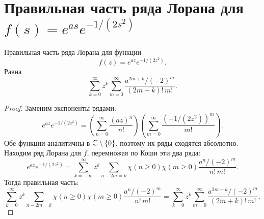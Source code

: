\section{Правильная часть ряда Лорана для $f(s) = e^{as} e^{-1/(2s^2)}$}
\begin{Th*}
    Правильная часть ряда Лорана для функции
\[
    f(z) = e^{az} e^{-1/(2z^2)}
.\]
Равна
\[
    \sum_{k=0}^{\infty} z^k \sum_{m=0}^{\infty} \frac{a^{2m+k} / (-2)^m}{(2m+k)!\,m!}
.\]
\end{Th*}
\begin{proof}
Заменим экспоненты рядами:
\[
    e^{az} e^{-1/(2z^2)} =
%
    \left( \sum_{n=0}^{\infty} \frac{(az)^n}{n!} \right)
    \left( \sum_{m=0}^{\infty} \frac{\left( -1 / \left( 2z^2 \right) \right)^m}{m!}  \right) 
.\]
Обе функции аналитичны в $\mathbb{C} \setminus \{0\}$, поэтому их ряды сходятся абсолютно. Находим ряд Лорана для $f$, перемножая по Коши эти два ряда:
\[
    e^{az} e^{-1/(2z^2)} =
    \sum_{k=-\infty}^{\infty} z^k \sum_{n-2m=k} \chi(n \ge 0) \chi(m \ge 0) \frac{a^n / (-2)^m}{n!\,m!}
.\]
Тогда правильная часть:
\[
    \sum_{k=0}^{\infty} z^k \sum_{n-2m=k} \chi(n \ge 0) \chi(m \ge 0) \frac{a^n / (-2)^m}{n!\,m!} =
    \sum_{k=0}^{\infty} z^k \sum_{m=0}^{\infty} \frac{a^{2m+k} / (-2)^m}{(2m+k)!\,m!}
.\]
\end{proof}

